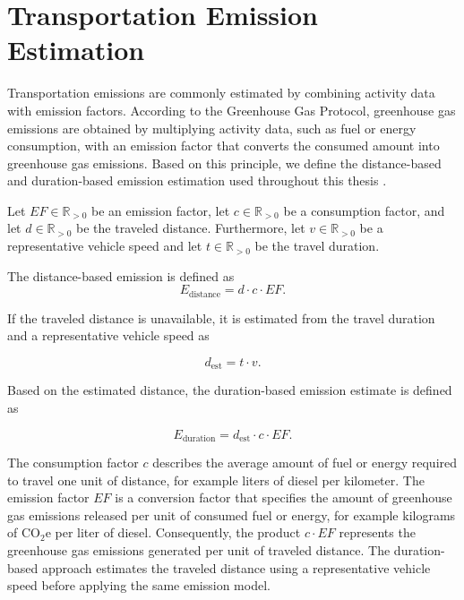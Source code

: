 


\section{Transportation Emission Estimation}

Transportation emissions are commonly estimated by combining activity data with emission factors. According to the Greenhouse Gas Protocol, greenhouse gas emissions are obtained by multiplying activity data, such as fuel or energy consumption, with an emission factor that converts the consumed amount into greenhouse gas emissions. Based on this principle, we define the distance-based and duration-based emission estimation used throughout this thesis \cite{ghg_protocol}.

\begin{definition}
Let $EF \in \mathbb{R}_{>0}$ be an emission factor, let
$c \in \mathbb{R}_{>0}$ be a consumption factor, and let
$d \in \mathbb{R}_{>0}$ be the traveled distance.
Furthermore, let
$v \in \mathbb{R}_{>0}$ be a representative vehicle speed and let
$t \in \mathbb{R}_{>0}$ be the travel duration.

The distance-based emission is defined as
\begin{equation}
E_{\mathrm{distance}}
=
d \cdot c \cdot EF.
\end{equation}

If the traveled distance is unavailable, it is estimated from the travel duration and a representative vehicle speed as

\begin{equation}
d_{\mathrm{est}}
=
t \cdot v.
\end{equation}

Based on the estimated distance, the duration-based emission estimate is defined as

\begin{equation}
E_{\mathrm{duration}}
=
d_{\mathrm{est}} \cdot c \cdot EF.
\end{equation}
\end{definition}

The consumption factor $c$ describes the average amount of fuel or energy required to travel one unit of distance, for example liters of diesel per kilometer. The emission factor $EF$ is a conversion factor that specifies the amount of greenhouse gas emissions released per unit of consumed fuel or energy, for example kilograms of $\mathrm{CO_2e}$ per liter of diesel. Consequently, the product $c \cdot EF$ represents the greenhouse gas emissions generated per unit of traveled distance. The duration-based approach estimates the traveled distance using a representative vehicle speed before applying the same emission model.